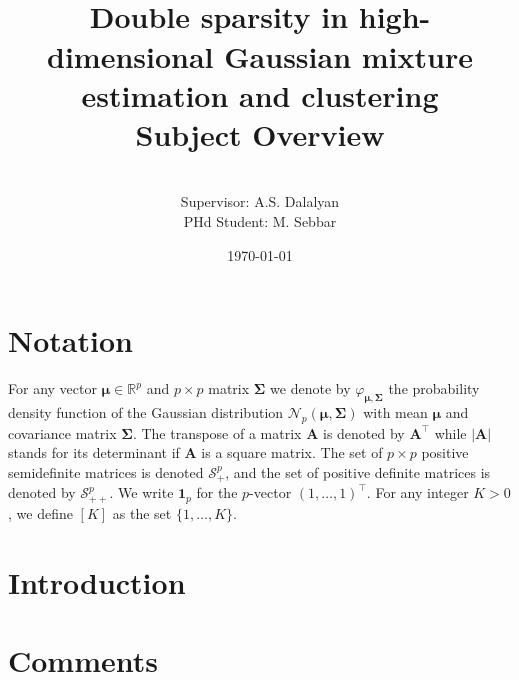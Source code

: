 \documentclass[a4paper,12pt]{article}
\title{\vspace{-60pt}~\\\textbf{\textsf{Double sparsity in high-dimensional Gaussian mixture estimation and clustering}}\\[20pt]
\textsf{Subject Overview}}
\author{\vspace{-20pt}~\\ \textsf{Supervisor: A.S. Dalalyan}\\
\textsf{PHd Student: M. Sebbar}}
\date{\today}
\let\bb\mathbb       %
\def\RR{{\bb R}}\def\ZZ{{\bb Z}}\def\FF{{\bb F}}\def\DD{{\bb D}}
\def\bb{\mathbb}
\def\bfA{\mathbf A}
\def\bSigma{\boldsymbol\Sigma}
\def\bmu{\boldsymbol\mu}
\def\b1{\mathbf 1}
\begin{document}
\maketitle
\tableofcontents
\newpage
\section{Notation}
For any vector $\bmu\in\RR^p$ and $p\times p$ matrix $\bSigma$ we denote by $\varphi_{\bmu,\bSigma}$ the probability density
function of the Gaussian distribution $\mathcal N_p(\bmu,\bSigma)$ with mean $\bmu$ and covariance matrix $\bSigma$.
The transpose of a matrix $\bfA $ is denoted by $\bfA ^\top$ while $|\bfA |$ stands for its determinant if $\bfA $ is a square matrix.
The set of $p\times p$ positive semidefinite matrices is denoted $\mathcal S_+^p$, and the set of positive definite
matrices is denoted by $\mathcal S_{++}^p$. We write $\b1_p$ for the $p$-vector $(1,\ldots,1)^\top$. For any integer $K>0$, we
define $[K]$ as the set $\{1,\ldots,K\}$.


\section{Introduction}



\newpage


\newpage






\section{Comments}


\end{document}
